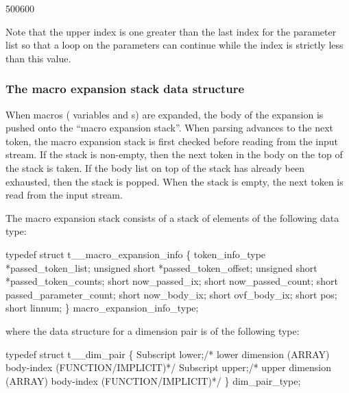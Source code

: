 \begin{fast_picture}{500}{600}
   \nextCbox\nextDbox{}
   \nextCbox\nextDbox{}
   \nextCbox\nextDbox{}
   \nextDbox{}
   \nextCbox{}
%
   \nextCbox\nextDbox{}
            \groundunderarrow
   \nextCbox\nextDbox{}
   \nextCbox\nextDbox{}
   \nextCbox\nextDbox{}
   \nextCbox\nextDbox{}
   \nextDbox{}
   \nextCbox{}
%
\nextCbox\nextCbox
\unsavCboxpos{}
\qqoff
%
\end{fast_picture}

Note that the upper index is one greater than the last index for the parameter
list so that a loop on the parameters can continue while the index is strictly
less than this value.

\subsubsection{The macro expansion stack data structure}
\label{sec:expand}

\renewcommand{\qqon}{\begin{scriptsize}\begin{sf}}
\renewcommand{\qqoff}{\end{sf}\end{scriptsize}}

When macros ( variables and s) are expanded, the
body of the expansion is pushed onto the ``macro expansion stack''.    When
parsing advances to the next token, the macro expansion stack is first checked
before reading from the input stream.   If the stack is non-empty, then the
next token in the body on the top of the stack is taken.  If the body list
on top of the stack has already been exhausted, then the stack is popped.
When the stack is empty, the next token is read from the input stream.

The macro expansion stack consists of a stack of elements of the
following data type:
\begin{codeexample}
typedef struct t__macro_expansion_info
   \{
       token_info_type *passed_token_list;
       unsigned short *passed_token_offset;
       unsigned short *passed_token_counts;
       short now_passed_ix;
       short now_passed_count;
       short passed_parameter_count;
       short now_body_ix;
       short ovf_body_ix;
       short pos;
       short linnum;
   \} macro_expansion_info_type;
\end{codeexample}
where the data structure for a dimension pair is of the following type:
\begin{codeexample}
typedef struct t__dim_pair
  \{
    Subscript lower;/* lower dimension (ARRAY) body-index (FUNCTION/IMPLICIT)*/
    Subscript upper;/* upper dimension (ARRAY) body-index (FUNCTION/IMPLICIT)*/
  \} dim_pair_type;
\end{codeexample}

